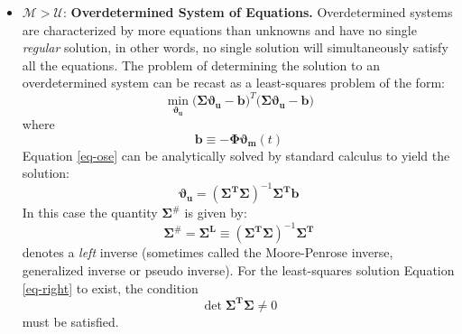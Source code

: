 \documentclass[11pt]{article}
\theoremstyle{definition}
\begin{document}
\begin{itemize}

\item{$\mathcal{M}>\mathcal{U}$: \textbf{Overdetermined System of Equations.}
Overdetermined systems are characterized by more equations than unknowns and have no single \emph{regular} solution, in other
words, no single solution will simultaneously satisfy all the equations. The problem of determining the solution to an overdetermined
system can be recast as a least-squares problem of the form:
\begin{equation}\label{eq-ose}
\min_{\mathbf{\vartheta_{u}}}\bigl(\mathbf{\Sigma\vartheta_{u}}-\mathbf{b}\bigr)^{T}\bigl(\mathbf{\Sigma\vartheta_{u}}-\mathbf{b}\bigr)
\end{equation}where
\begin{equation}
\mathbf{b}\equiv-\mathbf{\Phi\vartheta_{m}}\left(t\right)
\end{equation}
Equation \eqref{eq-ose} can be analytically solved by standard calculus to yield the solution:
\begin{equation}\label{eq-right}
\mathbf{\vartheta_{u}}=\left(\mathbf{\Sigma^{T}\Sigma}\right)^{-1}\mathbf{\Sigma^{T}b}
\end{equation}In this case the quantity $\mathbf{\Sigma}^{\#}$ is given by:
\begin{equation}
\mathbf{\Sigma}^{\#} = \mathbf{\Sigma^{L}}\equiv\left(\mathbf{\Sigma^{T}\Sigma}\right)^{-1}\mathbf{\Sigma^{T}}
\end{equation}denotes a \emph{left} inverse (sometimes called the Moore-Penrose inverse, generalized inverse or pseudo inverse).
For the least-squares solution Equation
\eqref{eq-right} to exist, the condition
\begin{equation}
\det\mathbf{\Sigma^{T}\Sigma}\neq{0}
\end{equation}must be satisfied.}


\end{itemize}
\end{document}
